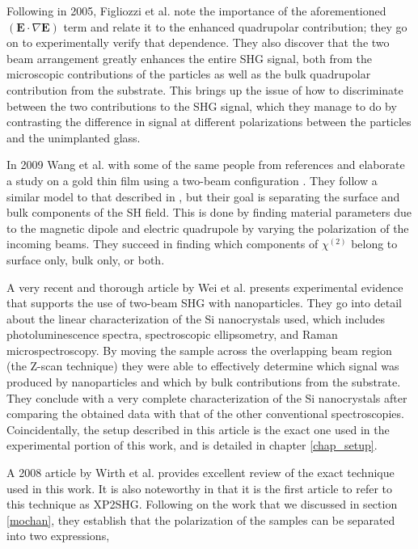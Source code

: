 Following in 2005, Figliozzi et al. \cite{figliozzi2005single} note the importance of the aforementioned $\left(\mathbf{E}\cdot\nabla\mathbf{E}\right)$ term and relate it to the enhanced quadrupolar contribution; they go on to experimentally verify that dependence. They also discover that the two beam arrangement greatly enhances the entire SHG signal, both from the microscopic contributions of the particles as well as the bulk quadrupolar contribution from the substrate. This brings up the issue of how to discriminate between the two contributions to the SHG signal, which they manage to do by contrasting the difference in signal at different polarizations between the particles and the unimplanted glass.

In 2009 Wang et al. with some of the same people from references \cite{klein2007experiments} and \cite{feth2008second} elaborate a study on a gold thin film using a two-beam configuration \cite{wang2009surface}. They follow a similar model to that described in \cite{figliozzi2005single}, but their goal is separating the surface and bulk components of the SH field. This is done by finding material parameters due to the magnetic dipole and electric quadrupole by varying the polarization of the incoming beams. They succeed in finding which components of $\chi^{(2)}$ belong to surface only, bulk only, or both.

A very recent and thorough article \cite{PhysRevB.84.165316} by Wei et al. presents experimental evidence that supports the use of two-beam SHG with nanoparticles. They go into detail about the linear characterization of the Si nanocrystals used, which includes photoluminescence spectra, spectroscopic ellipsometry, and Raman microspectroscopy. By moving the sample across the overlapping beam region (the Z-scan technique) they were able to effectively determine which signal was produced by nanoparticles and which by bulk contributions from the substrate. They conclude with a very complete characterization of the Si nanocrystals after comparing the obtained data with that of the other conventional spectroscopies. Coincidentally, the setup described in this article is the exact one used in the experimental portion of this work, and is detailed in chapter \ref{chap_setup}.

A 2008 article \cite{wirth2008second} by Wirth et al. provides excellent review of the exact technique used in this work. It is also noteworthy in that it is the first article to refer to this technique as XP2SHG. Following on the work that we discussed in section \ref{mochan}, they establish that the polarization of the samples can be separated into two expressions,

